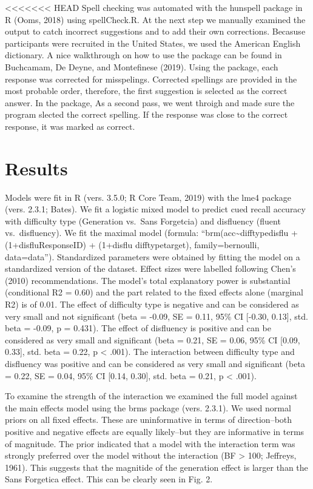 \documentclass[pdf]{apa6}
\begin{document}
<<<<<<< HEAD
Spell checking was automated with the hunspell package in R (Ooms, 2018) using spellCheck.R. At the next step we manually examined the output to catch incorrect suggestions and to add their own corrections. Becasuse participants were recruited in the United States, we used the American English dictionary. A nice walkthrough on how to use the package can be found in Buchcamam, De Deyne, and Montefinese (2019). Using the package, each response was corrected for misspelings. Corrected spellings are provided in the most probable order, therefore, the first suggestion is selected as the correct answer. In the package, As a second pass, we went throigh and made sure the program slected the correct spelling. If the response was close to the correct response, it was marked as correct.

\hypertarget{results}{%
\section{Results}\label{results}}

Models were fit in R (vers. 3.5.0; R Core Team, 2019) with the lme4 package (vers. 2.3.1; Bates). We fit a logistic mixed model to predict cued recall accuracy with difficulty type (Generation vs.~Sans Forgetcia) and disfluency (fluent vs.~disfluency). We fit the maximal model (formula: \enquote{brm(acc\textasciitilde{}difftypedisflu + (1+disflu\textbar{}ResponseID) + (1+disflu difftype\textbar{}target), family=bernoulli, data=data}). Standardized parameters were obtained by fitting the model on a standardized version of the dataset. Effect sizes were labelled following Chen's (2010) recommendations. The model's total explanatory power is substantial (conditional R2 = 0.60) and the part related to the fixed effects alone (marginal R2) is of 0.01. The effect of difficulty type is negative and can be considered as very small and not significant (beta = -0.09, SE = 0.11, 95\% CI {[}-0.30, 0.13{]}, std. beta = -0.09, p = 0.431). The effect of disfluency is positive and can be considered as very small and significant (beta = 0.21, SE = 0.06, 95\% CI {[}0.09, 0.33{]}, std. beta = 0.22, p \textless{} .001). The interaction between difficulty type and disfluency was positive and can be considered as very small and significant (beta = 0.22, SE = 0.04, 95\% CI {[}0.14, 0.30{]}, std. beta = 0.21, p \textless{} .001).

To examine the strength of the interaction we examined the full model against the main effects model using the brms package (vers. 2.3.1). We used normal priors on all fixed effects. These are uninformative in terms of direction--both positive and negative effects are equally likely--but they are informative in terms of magnitude. The prior indicated that a model with the interaction term was strongly preferred over the model without the interaction (BF \textgreater{} 100; Jeffreys, 1961). This suggests that the magnitide of the generation effect is larger than the Sans Forgetica effect. This can be clearly seen in Fig. 2.
\end{document}
